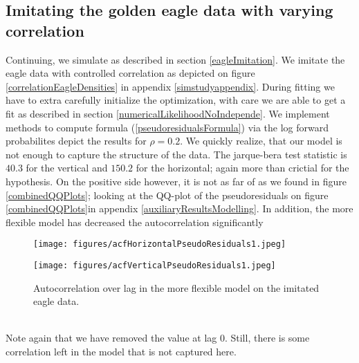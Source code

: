 \subsection{Imitating the golden eagle data with varying correlation}
Continuing, we simulate as described in section \ref{eagleImitation}. We imitate the eagle data with controlled correlation as depicted on figure \ref{correlationEagleDensities} in appendix \ref{simstudyappendix}. During fitting we have to extra carefully initialize the optimization, with care we are able to get a fit as described in section \ref{numericalLikelihoodNoIndepende}. We implement methods to compute formula (\ref{pseudoresidualsFormula}) via the log forward probabilites depict the results for $\rho = 0.2$. We quickly realize, that our model is not enough to capture the structure of the data. The jarque-bera test statistic is $40.3$ for the vertical and $150.2$ for the horizontal; again more than crictial for the hypothesis. On the positive side however, it is not as far of as we found in figure \ref{combinedQQPlots}; looking at the QQ-plot of the pseudoresiduals on figure \ref{combinedQQPlots}in appendix \ref{auxiliaryResultsModelling}. In addition, the more flexible model has decreased the autocorrelation significantly
\begin{figure}[h]
  \centering
  \begin{minipage}[b]{0.34\textwidth}
    \texttt{[image: figures/acfHorizontalPseudoResiduals1.jpeg]}
  \end{minipage}
  \hspace{0.03\textwidth}
  \begin{minipage}[b]{0.34\textwidth}
    \texttt{[image: figures/acfVerticalPseudoResiduals1.jpeg]}
  \end{minipage}
  \caption{Autocorrelation over lag in the more flexible model on the imitated eagle data.}
  \label{combinedACFPlotsImitated}
\end{figure}\\
Note again that we have removed the value at lag 0. Still, there is some correlation left in the model that is not captured here.
